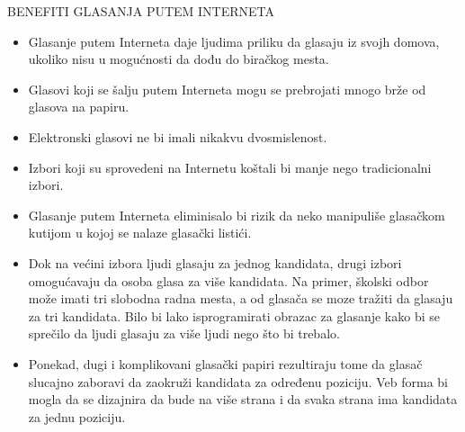 \documentclass[a4paper]{article}
\theoremstyle{break}
\begin{document}
{\noindent BENEFITI GLASANJA PUTEM INTERNETA
\begin{itemize}
\item Glasanje putem Interneta daje ljudima priliku da glasaju iz svojh domova, ukoliko nisu u mogućnosti da dođu do biračkog mesta.
\item Glasovi koji se šalju putem Interneta mogu se prebrojati mnogo brže od glasova na papiru.
\item Elektronski glasovi ne bi imali nikakvu dvosmislenost.
\item Izbori koji su sprovedeni na Internetu koštali bi manje nego tradicionalni izbori.
\item Glasanje putem Interneta eliminisalo bi rizik da neko manipuliše glasačkom kutijom u kojoj se nalaze glasački listići.
\item Dok na većini izbora ljudi glasaju za jednog kandidata, drugi izbori omogućavaju da osoba glasa za više kandidata. Na primer, školski odbor može imati tri slobodna radna mesta, a od glasača se moze tražiti da glasaju za tri kandidata. Bilo bi lako isprogramirati obrazac za glasanje kako bi se sprečilo da ljudi glasaju za više ljudi nego što bi trebalo.
\item Ponekad, dugi i komplikovani glasački papiri rezultiraju tome da glasač slucajno zaboravi da zaokruži kandidata za određenu poziciju. Veb forma bi mogla da se dizajnira da bude na više strana i da svaka strana ima kandidata za jednu poziciju.
\end{itemize}


}
\end{document}
